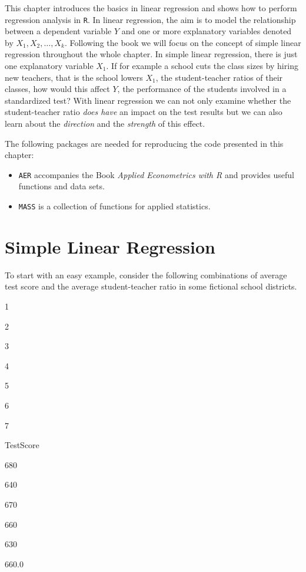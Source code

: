\documentclass[]{book}
\theoremstyle{definition}
\theoremstyle{definition}
\theoremstyle{definition}
\theoremstyle{remark}
\begin{document}
This chapter introduces the basics in linear regression and shows how to
perform regression analysis in \texttt{R}. In linear regression, the aim
is to model the relationship between a dependent variable \(Y\) and one
or more explanatory variables denoted by \(X_1, X_2, \dots, X_k\).
Following the book we will focus on the concept of simple linear
regression throughout the whole chapter. In simple linear regression,
there is just one explanatory variable \(X_1\). If for example a school
cuts the class sizes by hiring new teachers, that is the school lowers
\(X_1\), the student-teacher ratios of their classes, how would this
affect \(Y\), the performance of the students involved in a standardized
test? With linear regression we can not only examine whether the
student-teacher ratio \emph{does have} an impact on the test results but
we can also learn about the \emph{direction} and the \emph{strength} of
this effect.

The following packages are needed for reproducing the code presented in
this chapter:

\begin{itemize}
\item
  \texttt{AER} accompanies the Book \emph{Applied Econometrics with R}
  and provides useful functions and data sets.
\item
  \texttt{MASS} is a collection of functions for applied statistics.
\end{itemize}

\section{Simple Linear Regression}\label{simple-linear-regression}

To start with an easy example, consider the following combinations of
average test score and the average student-teacher ratio in some
fictional school districts.

1

2

3

4

5

6

7

TestScore

680

640

670

660

630

660.0
\end{document}
